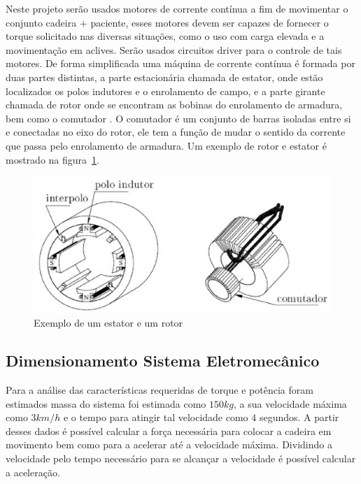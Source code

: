 Neste projeto serão usados motores de corrente contínua a fim de movimentar o conjunto
cadeira $+$ paciente, esses motores devem ser capazes de fornecer o torque solicitado
nas diversas situações, como o uso com carga elevada e a movimentação em aclives.
Serão usados circuitos driver para o controle de tais motores. De forma simplificada
uma máquina de corrente contínua é formada por duas partes distintas, a parte
estacionária chamada de estator, onde estão localizados os polos indutores e o
enrolamento de campo, e a parte girante chamada de rotor onde se encontram as
bobinas do enrolamento de armadura, bem como o comutador  \cite{bim}. O comutador
é um conjunto de barras isoladas entre si e conectadas no eixo do rotor, ele tem
a função de mudar o sentido da corrente que passa pelo enrolamento de armadura.
Um exemplo de rotor e estator é mostrado na figura~\ref{fig:rotor}.

\begin{figure}[H]
  \centering
    \includegraphics[width=\textwidth]{figuras/rotor.eps}
  \caption{Exemplo de um estator e um rotor \cite{bim}}
  \label{fig:rotor}
\end{figure}

\subsection{Dimensionamento Sistema Eletromecânico}

Para a análise das características requeridas de torque e potência foram estimados
massa do sistema foi estimada como $150 kg$, a sua velocidade máxima como $3 km/h$
e o tempo para atingir tal velocidade como $4$ segundos. A partir desses dados é
possível calcular a força necessária para colocar a cadeira em movimento bem como
para a acelerar até a velocidade máxima. Dividindo a velocidade pelo tempo necessário
para se alcançar a velocidade é possível calcular a aceleração.

